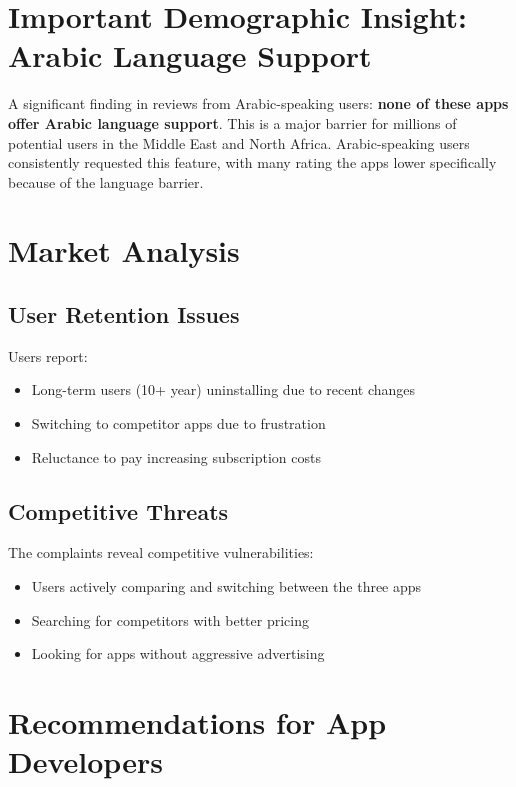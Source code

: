 \documentclass[12pt, a4paper]{article}
\begin{document}
\section{Important Demographic Insight: Arabic Language Support}

A significant finding in reviews from Arabic-speaking users: \textbf{none of these apps offer Arabic language support}. This is a major barrier for millions of potential users in the Middle East and North Africa. Arabic-speaking users consistently requested this feature, with many rating the apps lower specifically because of the language barrier.

\vspace{0.5cm}

\section{Market Analysis}

\subsection{User Retention Issues}

Users report:
\begin{itemize}
    \item Long-term users (10+ year) uninstalling due to recent changes
    \item Switching to competitor apps due to frustration
    \item Reluctance to pay increasing subscription costs
\end{itemize}

\subsection{Competitive Threats}

The complaints reveal competitive vulnerabilities:
\begin{itemize}
    \item Users actively comparing and switching between the three apps
    \item Searching for competitors with better pricing
    \item Looking for apps without aggressive advertising
\end{itemize}

\section{Recommendations for App Developers}
\end{document}
